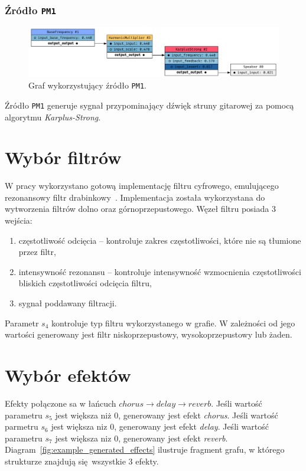 \subsubsection{Źródło \texttt{PM1}}

\begin{figure}[H]
    \centering
    \includegraphics[width=1.0\linewidth]{rys06/gene_pm1.png}
    \caption{
      Graf wykorzystujący źródło \texttt{PM1}.
    }\label{fig:gene_an3}
\end{figure}

Źródło \texttt{PM1} generuje sygnał przypominający dźwięk struny gitarowej 
za pomocą algorytmu \textit{Karplus-Strong}.

\section{Wybór filtrów}\label{sec:filters_selection_graph_structure}

W pracy wykorzystano gotową implementację filtru cyfrowego, emulującego
rezonansowy filtr drabinkowy~\cite{ladder_filter_rust}. Implementacja została
wykorzystana do wytworzenia filtrów dolno oraz górnoprzepustowego.
Węzeł filtru posiada 3 wejścia:

\begin{enumerate}
  \item częstotliwość odcięcia -- kontroluje zakres częstotliwości,
    które nie są tłumione przez filtr,
  \item intensywność rezonansu -- kontroluje intensywność wzmocnienia częstotliwości
    bliskich częstotliwości odcięcia filtru,
  \item sygnał poddawany filtracji.
\end{enumerate}

Parametr $s_4$ kontroluje typ filtru wykorzystanego w grafie. W zależności
od jego wartości generowany jest filtr niskoprzepustowy, wysokoprzepustowy lub
żaden.


\section{Wybór efektów}

Efekty połączone sa w łańcuch
$chorus \rightarrow delay \rightarrow reverb$. Jeśli wartość parametru $s_5$ jest
większa niż 0, generowany jest efekt \textit{chorus}. Jeśli wartość
parmetru $s_6$ jest większa niz 0, generowany jest efekt \textit{delay}.
Jeśli wartość parametru $s_7$ jest większa niz 0, generowany jest efekt \textit{reverb}.
Diagram~\ref{fig:example_generated_effects} ilustruje fragment grafu,
w którego strukturze znajdują się wszystkie 3 efekty.

